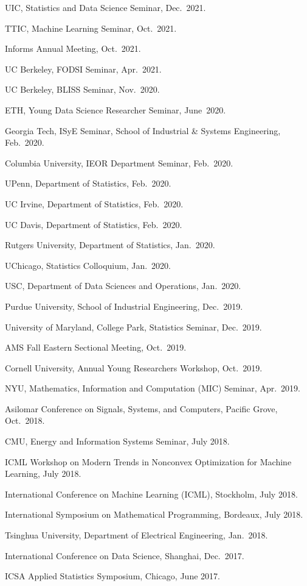 \documentclass[a4paper, 10pt]{article}
\newenvironment{changemargin}[2]{%
  \begin{list}{}{%
    \setlength{\topsep}{0pt}%
    \setlength{\leftmargin}{#1}%
    \setlength{\rightmargin}{#2}%
    \setlength{\listparindent}{\parindent}%
    \setlength{\itemindent}{\parindent}%
    \setlength{\parsep}{\parskip}%
  }%
  \item[]}{\end{list}
}
\newenvironment{body} {
	\vspace*{-16pt}
	\begin{changemargin}{-0.3in}{-0.5in}
  }	
	{\end{changemargin}
}
\begin{document}
\begin{body}
\begin{enumerate}[label={[{T}{{\arabic*}}]}]
	\item UIC, Statistics and Data Science Seminar, Dec.~2021. 
	
	
	\item TTIC, Machine Learning Seminar, Oct.~2021.
	
	\item Informs Annual Meeting, Oct.~2021.
	
	\item UC Berkeley, FODSI Seminar, Apr.~2021. 
	
	\item UC Berkeley, BLISS Seminar, Nov.~2020.
	\item ETH, Young Data Science Researcher Seminar, June~2020.
	\item Georgia Tech, ISyE Seminar, School of Industrial \& Systems Engineering, Feb.~2020.
	\item Columbia University, IEOR Department Seminar, Feb.~2020.
	\item UPenn, Department of Statistics, Feb.~2020.
	\item UC Irvine, Department of Statistics, Feb.~2020.
	\item UC Davis, Department of Statistics, Feb.~2020.
	\item Rutgers University, Department of Statistics, Jan.~2020.
	\item UChicago, Statistics Colloquium, Jan.~2020.
	\item USC, Department of Data Sciences and Operations, Jan.~2020.
	\item Purdue University, School of Industrial Engineering, Dec.~2019.
	\item University of Maryland, College Park, Statistics Seminar, Dec.~2019.
	\item AMS Fall Eastern Sectional Meeting, Oct.~2019.
	\item Cornell University, Annual Young Researchers Workshop, Oct.~2019.
	\item NYU, Mathematics, Information and Computation (MIC) Seminar, Apr.~2019.
		\item Asilomar Conference on Signals, Systems, and Computers, Pacific Grove, Oct.~2018.
		\item CMU, Energy and Information Systems Seminar, July 2018.
		\item ICML Workshop on Modern Trends in Nonconvex Optimization for Machine Learning, July 2018.
		\item International Conference on Machine Learning (ICML), Stockholm, July 2018.
		\item International Symposium on Mathematical Programming, Bordeaux, July 2018.
		\item Tsinghua University, Department of Electrical Engineering, Jan.~2018.
			
		\item International Conference on Data Science, Shanghai, Dec.~2017.
		\item ICSA Applied Statistics Symposium, Chicago, June 2017.
		
		\end{enumerate}
\end{body}
\end{document}
